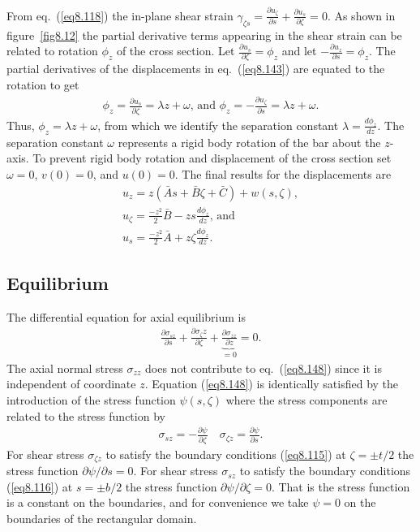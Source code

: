 \documentclass{AeroStructure-ERJohnson}
\begin{document}
\noindent
From eq.~(\ref{eq8.118}) the in-plane shear strain $\gamma_{\zeta
s}=\frac{\partial u_{\zeta}}{\partial s}+\frac{\partial
u_{s}}{\partial \zeta}=0$. As shown in figure~\ref{fig8.12} the partial
derivative terms appearing in the shear strain can be related to
rotation $\phi_{z}$ of the cross section. Let $\frac{\partial
u_{s}}{\partial \zeta}=\phi_{z}$ and let $-\frac{\partial
u_{z}}{\partial s}=\phi_{z}$. The partial derivatives of the
displacements in eq.~(\ref{eq8.143}) are equated to the rotation
to get
\begin{align}\label{eq8.144}
\phi_{z}=\frac{\partial u_{s}}{\partial \zeta}=\lambda z+\omega\mbox{,
and }\phi_{z}=-\frac{\partial u_{\zeta}}{\partial s}=\lambda
z+\omega .
\end{align}
\noindent Thus, $\phi_{z}=\lambda z+\omega$, from which we identify the
separation constant $\lambda=\frac{d \phi_{z}}{d z}$. The
separation constant $\omega$ represents a rigid body rotation of
the bar about the $z$-axis. To prevent rigid body rotation and
displacement of the cross section set $\omega=0$, $v(0)=0$, and
$u(0)=0$. The final results for the displacements are
\begin{gather}
u_{z}=z(\bar{A} s+\bar{B} \zeta+\bar{C})+w(s, \zeta),\label{eq8.145}\\
u_{\zeta}=\frac{-z^{2}}{2} \bar{B}-z s \frac{d \phi_{z}}{d z}\mbox{, and }\label{eq8.146}\\
u_{s}=\frac{-z^{2}}{2} \bar{A}+z \zeta \frac{d \phi_{z}}{d z}.\label{eq8.147}
\end{gather}

\subsection{Equilibrium}\label{sec8.4.2}

The differential equation for axial equilibrium is
\begin{align}\label{eq8.148}
\frac{\partial \sigma_{s z}}{\partial s}+\frac{\partial
\sigma_{\zeta} z}{\partial \zeta}+\underbrace{\frac{\partial
\sigma_{z z}}{\partial z}}_{=0}=0.
\end{align}
The axial normal stress $\sigma_{z z}$ does not contribute to
eq.~(\ref{eq8.148}) since it is independent of coordinate $z$.
Equation (\ref{eq8.148}) is identically satisfied by the
introduction of the stress function $\psi(s, \zeta)$ where the
stress components are related to the stress function by
\begin{align}\label{eq8.149}
\sigma_{s z}=-\frac{\partial \psi}{\partial \zeta} \quad
\sigma_{\zeta z}=\frac{\partial \psi}{\partial s}.
\end{align}
For shear stress $\sigma_{\zeta z}$ to satisfy the boundary
conditions (\ref{eq8.115}) at $\zeta=\pm t/ 2$ the stress
function $\partial \psi/ \partial s=0$. For shear stress
$\sigma_{s z}$ to satisfy the boundary conditions (\ref{eq8.116})
at $s=\pm b/ 2$ the stress function $\partial \psi/ \partial
\zeta=0$. That is the stress function is a constant on the
boundaries, and for convenience we take $\psi=0$ on the boundaries
of the rectangular domain.
\end{document}

